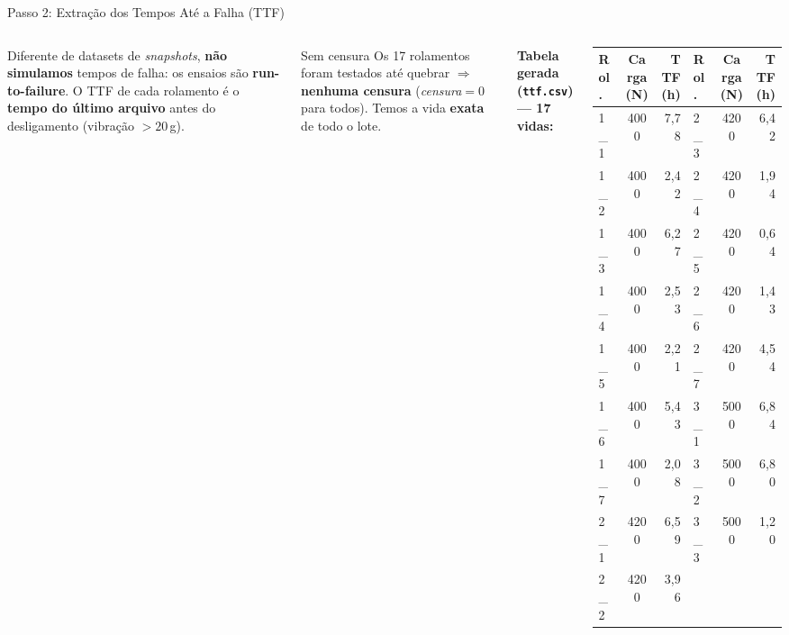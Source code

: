 \documentclass{beamer}
\begin{document}
\begin{frame}{Passo 2: Extração dos Tempos Até a Falha (TTF)}
    \begin{columns}
        \scriptsize
        Diferente de datasets de \textit{snapshots}, \textbf{não simulamos} tempos de falha: os ensaios são \textbf{run-to-failure}. O TTF de cada rolamento é o \textbf{tempo do último arquivo} antes do desligamento (vibração $>20$\,g).
        \vspace{0.15cm}

        \begin{block}{Sem censura}
            \scriptsize Os 17 rolamentos foram testados até quebrar $\Rightarrow$ \textbf{nenhuma censura} (\textit{censura}$=0$ para todos). Temos a vida \textbf{exata} de todo o lote.
        \end{block}
        \scriptsize
        \textbf{Tabela gerada (\texttt{ttf.csv}) --- 17 vidas:}
        \vspace{0.05cm}

        \tiny
        \begin{tabular}{lcr@{\hskip 8pt}lcr}
            \toprule
            \textbf{Rol.} & \textbf{Carga (N)} & \textbf{TTF (h)} & \textbf{Rol.} & \textbf{Carga (N)} & \textbf{TTF (h)} \\
            \midrule
            1\_1 & 4000 & 7,78 & 2\_3 & 4200 & 6,42 \\
            1\_2 & 4000 & 2,42 & 2\_4 & 4200 & 1,94 \\
            1\_3 & 4000 & 6,27 & 2\_5 & 4200 & 0,64 \\
            1\_4 & 4000 & 2,53 & 2\_6 & 4200 & 1,43 \\
            1\_5 & 4000 & 2,21 & 2\_7 & 4200 & 4,54 \\
            1\_6 & 4000 & 5,43 & 3\_1 & 5000 & 6,84 \\
            1\_7 & 4000 & 2,08 & 3\_2 & 5000 & 6,80 \\
            2\_1 & 4200 & 6,59 & 3\_3 & 5000 & 1,20 \\
            2\_2 & 4200 & 3,96 & & & \\
            \bottomrule
        \end{tabular}
    \end{columns}
\end{frame}
\end{document}
